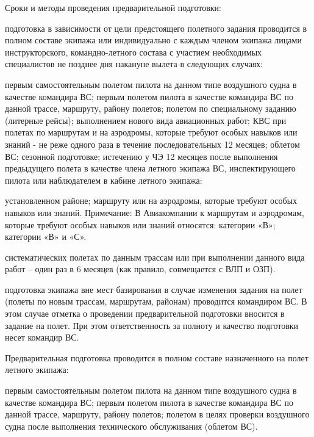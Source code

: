 Сроки и методы проведения предварительной подготовки:
\begin{enumerate}[label=\alph*), ref=\alph*]
 подготовка в зависимости от цели предстоящего полетного задания проводится в полном составе экипажа или индивидуально с каждым членом экипажа лицами инструкторского, командно-летного состава с участием необходимых специалистов не позднее дня накануне вылета в следующих случаях:
    \begin{itemize}    
         первым самостоятельным полетом пилота на данном типе воздушного судна в качестве командира ВС;
         первым полетом пилота в качестве командира ВС по данной трассе, маршруту, району полетов; 
         полетом по специальному заданию (литерные рейсы);
         выполнением нового вида авиационных работ;
         КВС при полетах по маршрутам и на аэродромы, которые требуют особых навыков или знаний - не реже одного раза в течение последовательных 12 месяцев; 
         облетом ВС; 
         сезонной подготовке; 
         истечению у ЧЭ 12 месяцев после выполнения предыдущего полета в качестве члена летного экипажа ВС, инспектирующего пилота или наблюдателем в кабине летного экипажа:
        \begin{itemize} 
             установленном районе;
             маршруту или на аэродромы, которые требуют особых навыков или знаний. 
Примечание: В Авиакомпании к маршрутам и аэродромам, которые требуют особых навыков или знаний относятся:
             категории «В»; 
             категории «В» и «С».
        \end{itemize}
         систематических полетах по данным трассам или при выполнении данного вида работ – один раз в 6 месяцев (как правило, совмещается с ВЛП и ОЗП).
    \end{itemize}
 подготовка экипажа вне мест базирования в случае изменения задания на полет (полеты по новым трассам, маршрутам, районам) проводится командиром ВС. В этом случае отметка о проведении предварительной подготовки вносится в задание на полет. При этом ответственность за полноту и качество подготовки несет командир ВС.
\end{enumerate}

Предварительная подготовка проводится в полном составе назначенного на полет летного экипажа:
\begin{enumerate}[label=\alph*), ref=\alph*]
     первым самостоятельным полетом пилота на данном типе воздушного судна в качестве командира ВС; 
     первым полетом пилота в качестве командира ВС по данной трассе, маршруту, району полетов; 
     полетом в целях проверки воздушного судна после выполнения технического обслуживания (облетом ВС).
\end{enumerate}

